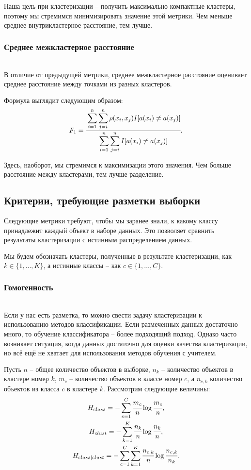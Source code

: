 Наша цель при кластеризации -- получить максимально компактные кластеры, поэтому мы стремимся минимизировать значение этой метрики.  Чем меньше среднее внутрикластерное расстояние, тем лучше.

\subsubsection{Среднее межкластерное расстояние} \hfill\\

В отличие от предыдущей метрики, среднее межкластерное расстояние оценивает среднее расстояние между точками из разных кластеров.  

Формула выглядит следующим образом:
\begin{equation*}
    F_1 = \cfrac{\displaystyle\sum_{i=1}^n \sum_{j=i}^n \rho(x_i,  x_j) I[a(  x_i)\ne a(x_j)]}{\displaystyle\sum_{i=1}^n \sum _ {j=i}^n I[ a(x_i)\ne a(x_j)]}.
\end{equation*}

Здесь, наоборот, мы стремимся к максимизации этого значения.  Чем больше расстояние между кластерами, тем лучше разделение.  

\subsection{Критерии, требующие разметки выборки}

Следующие метрики требуют, чтобы мы заранее знали, к какому классу принадлежит каждый объект в наборе данных.  Это позволяет сравнить результаты кластеризации с истинным распределением данных.

Мы будем обозначать кластеры, полученные в результате кластеризации, как $k \in \{1, \ldots, K\}$, а истинные классы -- как $c \in \{1, \ldots, C\}$.

\subsubsection{Гомогенность} \hfill\\

Если у нас есть разметка, то можно свести задачу кластеризации к использованию методов классификации. Если размеченных данных достаточно много, то обучение классификатора -- более подходящий подход. Однако часто возникает ситуация, когда данных достаточно для оценки качества кластеризации, но всё ещё не хватает для использования методов обучения с учителем.

Пусть $n$ -- общее количество объектов в выборке, $n_k$ -- количество объектов в кластере номер $k$, $m_c$ -- количество объектов в классе номер $c$, а $n_{c,k}$ количество объектов из класса $c$ в кластере $k$. Рассмотрим следующие величины:
\begin{gather*}
    H_{class} = -\displaystyle\sum_{c=1}^C \cfrac{m_c}{n} \log\cfrac{m_c}{n}, \\
    H_{clust} = -\displaystyle\sum_{k=1}^K \cfrac{n_k}{n} \log\cfrac{n_k}{n}, \\
    H_{class \vert clust} = -\displaystyle\sum_{c=1}^C \sum_{k=1}^K \cfrac{n_{c,k}}{n} \log\cfrac{n_{c,k}}{n_k}.
\end{gather*}

